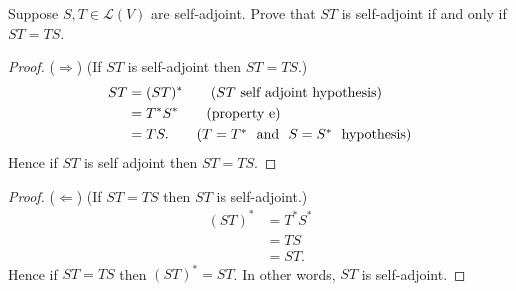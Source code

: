 Suppose $S,T \in \mathcal{L}(V)$ are self-adjoint.  Prove that $ST$ is self-adjoint if and only if $ST = TS$.

\vspace{.1in}

\begin{proof} ($\Longrightarrow$) (If $ST$ is self-adjoint then $ST=TS$.)
\begin{align*}
    ST &= (ST)^* \tag{\text{$ST$ self adjoint hypothesis}}\\
    &= T^* S^* \tag{\text{property e}} \\
    &= TS. \tag{$T = T^*$ \text{ and } $S=S^*$ \text{ hypothesis}}
\end{align*}
Hence if $ST$ is self adjoint then $ST = TS$.
\end{proof}

\vspace{0.3in}
\begin{proof} ($\Longleftarrow$) (If $ST = TS$ then $ST$ is self-adjoint.)
    \begin{align*}
        (ST)^* &= T^*S^* \tag{property e}\\
        &= TS \tag{$T=T^*$ and $S=S^*$ hypothesis}\\
        &= ST. \tag{$ST = TS$ hypothesis}
    \end{align*}
    Hence if $ST = TS$ then $(ST)^*=ST$. In other words, $ST$ is self-adjoint.
    \end{proof}
    